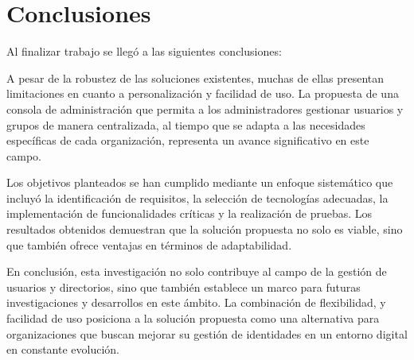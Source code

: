 \section{Conclusiones}

Al finalizar trabajo se llegó a las siguientes conclusiones:

A pesar de la robustez de las soluciones existentes, muchas de ellas presentan limitaciones en cuanto a personalización y facilidad de uso. La propuesta de una consola de administración que permita a los administradores gestionar usuarios y grupos de manera centralizada, al tiempo que se adapta a las necesidades específicas de cada organización, representa un avance significativo en este campo.

Los objetivos planteados se han cumplido mediante un enfoque sistemático que incluyó la identificación de requisitos, la selección de tecnologías adecuadas, la implementación de funcionalidades críticas y la realización de pruebas. Los resultados obtenidos demuestran que la solución propuesta no solo es viable, sino que también ofrece ventajas en términos de adaptabilidad.

En conclusión, esta investigación no solo contribuye al campo de la gestión de usuarios y directorios, sino que también establece un marco para futuras investigaciones y desarrollos en este ámbito. La combinación de flexibilidad, y facilidad de uso posiciona a la solución propuesta como una alternativa para organizaciones que buscan mejorar su gestión de identidades en un entorno digital en constante evolución.
